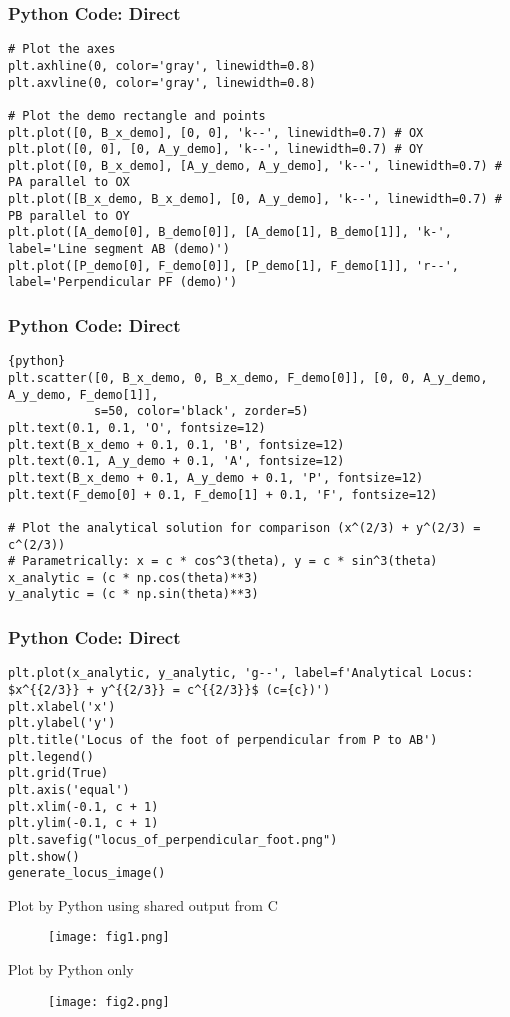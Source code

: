 \documentclass{beamer}
\begin{document}
\begin{frame}[fragile]
\frametitle{Python Code: Direct}
\begin{lstlisting}
# Plot the axes
plt.axhline(0, color='gray', linewidth=0.8)
plt.axvline(0, color='gray', linewidth=0.8)

# Plot the demo rectangle and points
plt.plot([0, B_x_demo], [0, 0], 'k--', linewidth=0.7) # OX
plt.plot([0, 0], [0, A_y_demo], 'k--', linewidth=0.7) # OY
plt.plot([0, B_x_demo], [A_y_demo, A_y_demo], 'k--', linewidth=0.7) # PA parallel to OX
plt.plot([B_x_demo, B_x_demo], [0, A_y_demo], 'k--', linewidth=0.7) # PB parallel to OY
plt.plot([A_demo[0], B_demo[0]], [A_demo[1], B_demo[1]], 'k-', label='Line segment AB (demo)')
plt.plot([P_demo[0], F_demo[0]], [P_demo[1], F_demo[1]], 'r--', label='Perpendicular PF (demo)')
\end{lstlisting}
\end{frame}

\begin{frame}[fragile]
\frametitle{Python Code: Direct}
\begin{lstlisting}{python}
plt.scatter([0, B_x_demo, 0, B_x_demo, F_demo[0]], [0, 0, A_y_demo, A_y_demo, F_demo[1]],
            s=50, color='black', zorder=5)
plt.text(0.1, 0.1, 'O', fontsize=12)
plt.text(B_x_demo + 0.1, 0.1, 'B', fontsize=12)
plt.text(0.1, A_y_demo + 0.1, 'A', fontsize=12)
plt.text(B_x_demo + 0.1, A_y_demo + 0.1, 'P', fontsize=12)
plt.text(F_demo[0] + 0.1, F_demo[1] + 0.1, 'F', fontsize=12)

# Plot the analytical solution for comparison (x^(2/3) + y^(2/3) = c^(2/3))
# Parametrically: x = c * cos^3(theta), y = c * sin^3(theta)
x_analytic = (c * np.cos(theta)**3)
y_analytic = (c * np.sin(theta)**3)
\end{lstlisting}
\end{frame}

\begin{frame}[fragile]
\frametitle{Python Code: Direct}
\begin{lstlisting}
plt.plot(x_analytic, y_analytic, 'g--', label=f'Analytical Locus: $x^{{2/3}} + y^{{2/3}} = c^{{2/3}}$ (c={c})')
plt.xlabel('x')
plt.ylabel('y')
plt.title('Locus of the foot of perpendicular from P to AB')
plt.legend()
plt.grid(True)
plt.axis('equal')
plt.xlim(-0.1, c + 1)
plt.ylim(-0.1, c + 1)
plt.savefig("locus_of_perpendicular_foot.png")
plt.show()
generate_locus_image()
\end{lstlisting}
\end{frame}

\begin{frame}{Plot by Python using shared output from C}
\begin{figure}[H]
\centering
\texttt{[image: fig1.png]}
\caption{}
\label{fig:1}
\end{figure}
\end{frame}

\begin{frame}{Plot by Python only}
\begin{figure}[H]
\centering
\texttt{[image: fig2.png]}
\caption{}
\label{fig:2}
\end{figure}
\end{frame}
\end{document}
